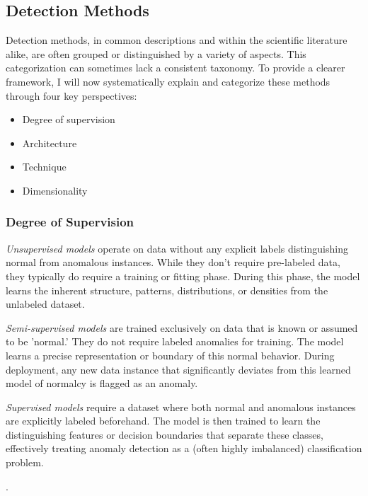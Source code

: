 \documentclass[12pt,oneside]{article}
\begin{document}
\subsection{Detection Methods}
Detection methods, in common descriptions and within the scientific literature alike, are often grouped or distinguished by a variety of aspects. This categorization can sometimes lack a consistent taxonomy. To provide a clearer framework, I will now systematically explain and categorize these methods through four key perspectives:
\begin{itemize}
    \item Degree of supervision
    \item Architecture
    \item Technique
    \item Dimensionality
\end{itemize}

\subsubsection{Degree of Supervision} \textit{Unsupervised models} operate on data without any explicit labels distinguishing normal from anomalous instances. While they don't require pre-labeled data, they typically do require a training or fitting phase. During this phase, the model learns the inherent structure, patterns, distributions, or densities from the unlabeled dataset.\par \textit{Semi-supervised models} are trained exclusively on data that is known or assumed to be 'normal.' They do not require labeled anomalies for training. The model learns a precise representation or boundary of this normal behavior. During deployment, any new data instance that significantly deviates from this learned model of normalcy is flagged as an anomaly. \par \textit{Supervised models} require a dataset where both normal and anomalous instances are explicitly labeled beforehand. The model is then trained to learn the distinguishing features or decision boundaries that separate these classes, effectively treating anomaly detection as a (often highly imbalanced) classification problem. \par
\parencites[pp.~5-6]{boniol2024divetimeseriesanomalydetection}[p.~3]{liu2024elephant}[p.~3-4]{SchmidlEtAl2022Anomaly}.
\end{document}
